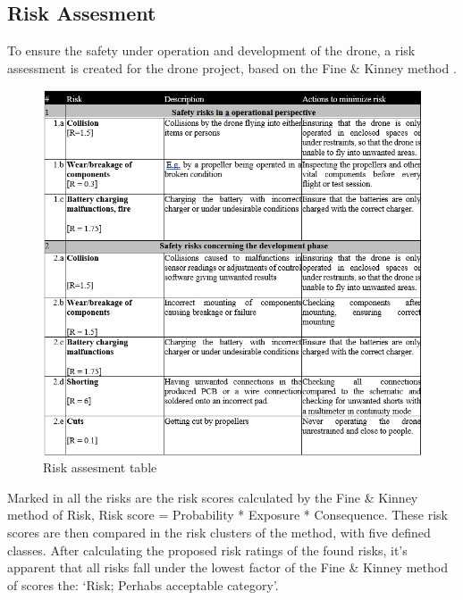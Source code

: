 \subsection{Risk Assesment}

To ensure the safety under operation and development of the drone, a risk assessment is created for the drone project, based on the Fine \& Kinney method \cite{finekinney}.

\begin{figure}[H]
    \begin{center}
    \includegraphics[scale=0.7]{pictures/Risk assesment table.png}
    \end{center}
    \caption{Risk assesment table}
    \label{Risk assesment table}
\end{figure}

Marked in all the risks are the risk scores calculated by the Fine \& Kinney method of Risk, Risk score = Probability * Exposure * Consequence. These risk scores are then compared in the risk clusters of the method, with five defined classes. After calculating the proposed risk ratings of the found risks, it’s apparent that all risks fall under the lowest factor of the Fine \& Kinney method of scores the: ‘Risk; Perhabs acceptable category’. 
